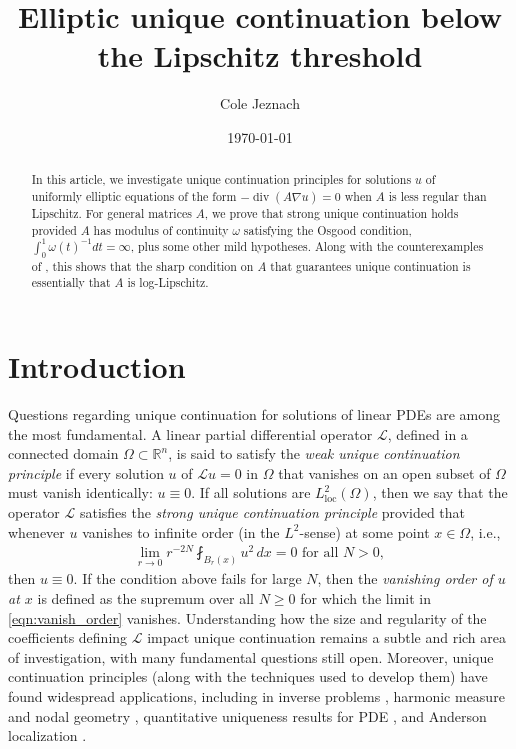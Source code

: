 \documentclass[12pt,leqno]{amsart}
\title{Elliptic unique continuation below the Lipschitz threshold}
\author{Cole Jeznach}
\date{\today}
\numberwithin{equation}{section}
\theoremstyle{definition}
\newcommand{\R}{\mathbb{R}}
\newcommand{\ra}{\rightarrow}
\newcommand{\loc}{\mathrm{loc}}
\DeclareMathOperator{\divv}{\mathrm{div}}
\begin{document}
\begin{abstract}
	In this article, we investigate unique continuation principles for solutions $u$ of uniformly elliptic equations of the form $- \divv (A \nabla u) =0$ when $A$ is less regular than Lipschitz. For general matrices $A$, we prove that strong unique continuation holds provided  $A$ has modulus of continuity $\omega$ satisfying the Osgood condition, $\int_0^1 \omega(t)^{-1} dt = \infty$, plus some other mild hypotheses. Along with the counterexamples of \cite{Mandache-ceg}, this shows that the sharp condition on $A$ that guarantees unique continuation is essentially that $A$ is log-Lipschitz.
\end{abstract}



\maketitle



\section{Introduction}

Questions regarding unique continuation for solutions of linear PDEs are among the most fundamental. A linear partial differential operator $\mathcal{L}$, defined in a connected domain $\Omega \subset \R^n$, is said to satisfy the \textit{weak unique continuation principle} if every solution $u$ of $\mathcal{L}u = 0$ in $\Omega$ that vanishes on an open subset of $\Omega$ must vanish identically: $u \equiv 0$. If all solutions are  $L^2_{\loc}(\Omega)$, then we say that the operator $\mathcal{L}$ satisfies the \textit{strong unique continuation principle} provided that whenever $u$ vanishes to infinite order (in the $L^2$-sense) at some point $x \in \Omega$, i.e.,
\begin{align} \label{eqn:vanish_order}
	\lim_{r \ra 0} r^{-2N} \fint_{B_r(x)} u^2 \, dx = 0 \text { for all } N >0,
\end{align}
 then $u \equiv 0$. If the condition above fails for large $N$, then the \textit{vanishing order of $u$ at $x$} is defined as the supremum over all $ N \ge 0$ for which the limit in \eqref{eqn:vanish_order} vanishes. Understanding how the size and regularity of the coefficients defining $\mathcal{L}$ impact unique continuation remains a subtle and rich area of investigation, with many fundamental questions still open. Moreover, unique continuation principles (along with the techniques used to develop them) have found widespread applications, including in inverse problems \cite{KSU07, Haberman15, CR16}, harmonic measure and nodal geometry \cite{DF88, Logunov18-poly, Logunov18-lower, LMNN21, Tolsa23}, quantitative uniqueness results for PDE \cite{ESS03a, ESS03b, KSW15,LMNN25}, and Anderson localization \cite{BK05}.
\end{document}
